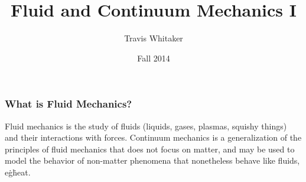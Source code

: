 \documentclass{beamer}
\begin{document}
\title{Fluid and Continuum Mechanics I}
\author{Travis Whitaker}
\date{Fall 2014}
\maketitle

\begin{frame}
\frametitle{What is Fluid Mechanics?}
Fluid mechanics is the study of fluids (liquids, gases, plasmas, squishy things) and their interactions with forces. Continuum mechanics is a generalization of the principles of fluid mechanics that does not focus on matter, and may be used to model the behavior of non-matter phenomena that nonetheless behave like fluids, e\.g\. heat.
\end{frame}
\end{document}
